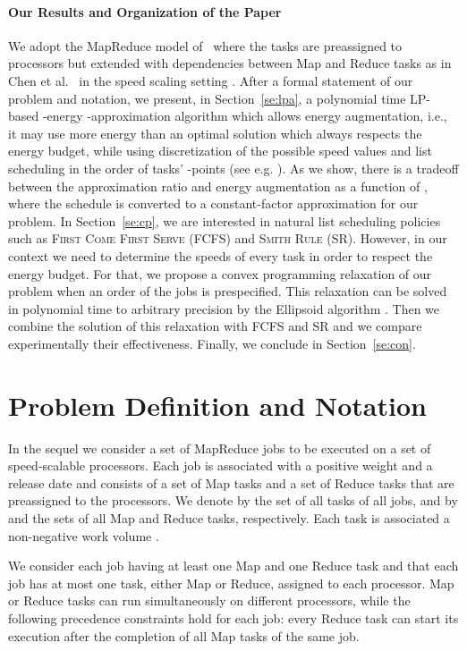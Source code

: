 \documentclass{llncs}
\newcommand{\fcfs}{\textsc{FCFS}\xspace}
\newcommand{\sr}{\textsc{SR}\xspace}
\begin{document}
\paragraph{Our Results and Organization of the Paper}
We adopt the MapReduce model of~\cite{ChangKKLLM11} where the tasks are preassigned to processors
but extended with dependencies between Map and Reduce tasks
as in Chen et al.~\cite{ChenKL12,MoseleyDKS11} in the speed scaling setting \cite{YaoDS95}.
After a formal statement of our problem and notation, we present, in Section~\ref{se:lpa}, a polynomial time LP-based -energy -approximation algorithm which allows energy augmentation, i.e., it may use more energy than an optimal solution which always respects the energy budget, while using discretization of the possible speed values and list scheduling in the order of tasks' -points (see e.g. \cite{PhillipsSW97,HallSW96,Skutella06}).
As we show, there is a tradeoff between the approximation ratio and energy augmentation as a function of , where the schedule is converted to a constant-factor approximation for our problem.
In Section~\ref{se:cp}, we are interested in natural list scheduling policies such as \textsc{First Come First Serve} (\fcfs) and \textsc{Smith Rule} (\sr). However, in our context we need to determine the speeds of every task in order to respect the energy budget. For that, we propose a convex programming relaxation of our problem when an order of the jobs is prespecified.
This relaxation can be solved in polynomial time to arbitrary precision by the Ellipsoid algorithm \cite{NesterovNN94}.
Then we combine the solution of this relaxation with  \fcfs and \sr and  we compare experimentally their effectiveness.
Finally, we conclude in Section~\ref{se:con}.

\section{Problem Definition and Notation}

In the sequel we consider a set  of  MapReduce jobs to be executed
on a set  of  speed-scalable processors.
Each job is associated with a positive weight  and a release date 
and consists of a set of Map tasks and a set of Reduce tasks that are preassigned to the  processors.
We denote by  the set of all tasks of all jobs,
and by  and  the sets of all Map and Reduce tasks, respectively.
Each task  is associated a non-negative work volume .

We consider each job having at least one Map and one Reduce task and
that each job  has at most one task, either Map or Reduce, assigned to each processor.
Map or Reduce tasks can run simultaneously on different processors, while the following precedence constraints hold for each job:
every Reduce task can start its execution after the completion of all Map tasks of the same job.
\end{document}
